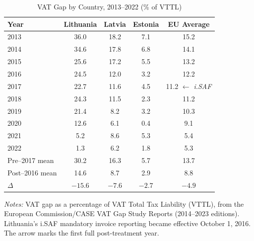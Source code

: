 \begin{table}[t]
\centering
\caption{VAT Gap by Country, 2013--2022 (\% of VTTL)}
\label{tab:vatgap}
\small
\begin{tabular}{lcccc}
\hline\hline
Year & Lithuania & Latvia & Estonia & EU Average \\
\hline
2013 & 36.0 & 18.2 & 7.1 & 15.2 \\
2014 & 34.6 & 17.8 & 6.8 & 14.1 \\
2015 & 25.6 & 17.2 & 5.5 & 13.2 \\
2016 & 24.5 & 12.0 & 3.2 & 12.2 \\
2017 & 22.7 & 11.6 & 4.5 & 11.2 $\leftarrow$ \textit{i.SAF} \\
2018 & 24.3 & 11.5 & 2.3 & 11.2 \\
2019 & 21.4 & 8.2 & 3.2 & 10.3 \\
2020 & 12.6 & 6.1 & 0.4 & 9.1 \\
2021 & 5.2 & 8.6 & 5.3 & 5.4 \\
2022 & 1.3 & 6.2 & 1.8 & 5.3 \\
\hline
Pre--2017 mean & 30.2 & 16.3 & 5.7 & 13.7 \\
Post--2016 mean & 14.6 & 8.7 & 2.9 & 8.8 \\
$\Delta$ & $-15.6$ & $-7.6$ & $-2.7$ & $-4.9$ \\
\hline\hline
\end{tabular}
\begin{tablenotes}
\item \textit{Notes:} VAT gap as a percentage of VAT Total Tax Liability (VTTL), from the European Commission/CASE VAT Gap Study Reports (2014--2023 editions). Lithuania's i.SAF mandatory invoice reporting became effective October 1, 2016. The arrow marks the first full post-treatment year.
\end{tablenotes}
\end{table}
